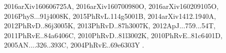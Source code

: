 \documentclass[12pt]{article}
\begin{document}
\begin{enumerate}
\begin{enumerate}
{2016arXiv160606725A,%
2016arXiv160700980O,%
2016arXiv160209105O,%
2016PhyS...91j4008K,%
2015PhRvL.114g5001B,%
2014arXiv1412.1940A,%
2012PhRvD..86j3005K,%
2013PhRvD..87h3007K,%
2012ApJ...759...54T,%
2011PhRvE..84a6406C,%
2010PhRvD..81l3002K,%
2010PhRvE..81c6401D,%
2005AN....326..393C,%
2004PhRvE..69e6303Y%
}.


\end{enumerate}
\end{enumerate}
\end{document}
